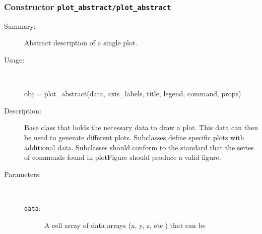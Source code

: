 \subsubsection[Constructor \texttt{plot\_abstract}]{Constructor \texttt{plot\_abstract/plot\_abstract}}%
%
\label{ref_plot_abstract__plot_abstract}%
\hypertarget{ref_plot_abstract__plot_abstract}{}%
\begin{description}
\item[Summary:]Abstract description of a single plot.
%
\item[Usage:]~%
\begin{lyxcode}%
obj = plot\_abstract(data, axis\_labels, title, legend, command, props)
%
\end{lyxcode}%
%
\item[Description:]%
Base class that holds the necessary data to draw a plot. This data
 can then be used to generate different plots. Subclasses define specific
 plots with additional data. Subclasses should conform to the standard 
 that the series of commands found in plotFigure should produce a valid
 figure.
\item[Parameters:]~
\begin{description}%
\item[\texttt{data}:]
 A cell array of data arrays (x, y, z, etc.) that can be 


\end{description}
\end{description}
